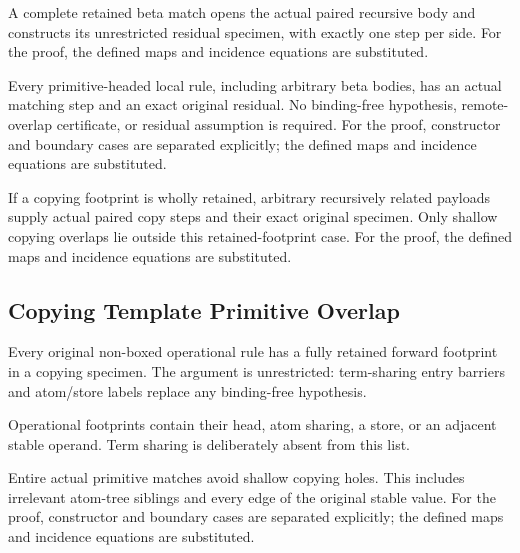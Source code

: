 A complete retained beta match opens the actual paired recursive body and constructs its unrestricted residual specimen, with exactly one step per side.
For the proof, the defined maps and incidence equations are substituted.
\par{}

Every primitive-headed local rule, including arbitrary beta bodies, has an actual matching step and an exact original residual. No binding-free hypothesis, remote-overlap certificate, or residual assumption is required.
For the proof, constructor and boundary cases are separated explicitly; the defined maps and incidence equations are substituted.
\par{}

If a copying footprint is wholly retained, arbitrary recursively related payloads supply actual paired copy steps and their exact original specimen. Only shallow copying overlaps lie outside this retained-footprint case.
For the proof, the defined maps and incidence equations are substituted.
\par{}

\subsection{Copying Template Primitive Overlap}
Every original non-boxed operational rule has a fully retained forward footprint in a copying specimen. The argument is unrestricted: term-sharing entry barriers and atom/store labels replace any binding-free hypothesis.

Operational footprints contain their head, atom sharing, a store, or an adjacent stable operand. Term sharing is deliberately absent from this list.
\par{}

Entire actual primitive matches avoid shallow copying holes. This includes irrelevant atom-tree siblings and every edge of the original stable value.
For the proof, constructor and boundary cases are separated explicitly; the defined maps and incidence equations are substituted.
\par{}

